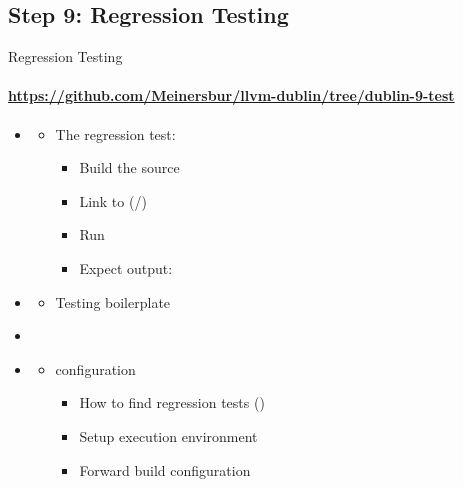 \subsection{Step 9: Regression Testing}
\begin{frame}[fragile]{Regression Testing}
\framesubtitle{\url{https://github.com/Meinersbur/llvm-dublin/tree/dublin-9-test}}
\begin{itemize}
 \item[\pgfuseimage{file}] 
    \begin{itemize}
    \item The regression test:
      \begin{itemize}
      \item Build the source
      \item Link to (/)
      \item Run
      \item Expect output: 
      \end{itemize}
    \end{itemize}
\item[\pgfuseimage{file}] 
  \begin{itemize}
  \item Testing boilerplate
  \end{itemize}
 \item[\pgfuseimage{file}] 
 \item[\pgfuseimage{file}] 
    \begin{itemize}
    \item {} configuration
      \begin{itemize}
      \item How to find regression tests ()
      \item Setup execution environment
      \item Forward build configuration
      \end{itemize}
    \end{itemize}
\end{itemize}
\end{frame}



